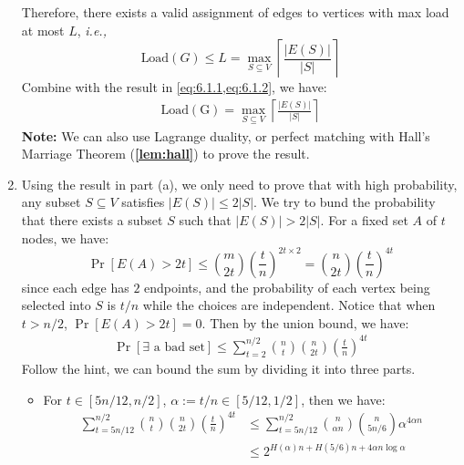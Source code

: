 \begin{answer}
\begin{enumerate}[label=\alph*).]
        Therefore, there exists a valid assignment of edges to vertices with max load at most $L$, \textit{i.e.,}
        \begin{equation}
            \label{eq:6.1.2}
            \text{Load}(G) \le L = \max_{S\subseteq V}\left\lceil\frac{|E(S)|}{|S|}\right\rceil
        \end{equation}
        Combine with the result in \cref{eq:6.1.1,eq:6.1.2}, we have:
        \begin{align*}
            \operatorname{Load(G)}=\max_{S\subseteq V}\left\lceil\frac{|E(S)|}{|S|}\right\rceil
        \end{align*}
        \textbf{Note:} We can also use Lagrange duality, or perfect matching with Hall's Marriage Theorem (\textbf{\cref{lem:hall}}) to prove the result.
        \item Using the result in part (a), we only need to prove that with high probability, any subset $S \subseteq V$ 
        satisfies $|E(S)| \le 2|S|$. We try to bund the probability that there exists a subset $S$ such that $|E(S)| > 2|S|$. For a fixed set $A$ of $t$ nodes, we have:
        \begin{equation*}
            \Pr\left[E(A) > 2t\right] \le \binom{m}{2t} \left(\frac{t}{n}\right)^{2t\times 2} = \binom{n}{2t} \left(\frac{t}{n}\right)^{4t}
        \end{equation*}
        since each edge has $2$ endpoints, and the probability of each vertex being selected into $S$ is $t / n$ while the choices are independent. 
        Notice that when $t > n/2$, $\Pr\left[E(A) > 2t\right] = 0$.
        Then by the union bound, we have:
        \begin{align*}
            \Pr\left[\exists \text{ a bad set}\right] \le \sum_{t = 2}^{n/2} \binom{n}{t} \binom{n}{2t} \left(\frac{t}{n}\right)^{4t}
        \end{align*}
        Follow the hint, we can bound the sum by dividing it into three parts. 
        \begin{itemize}
            \item For $t \in [5n/12, n/2]$, $\alpha := t / n \in [5/12, 1/2]$, then we have:
            \begin{align*}
                \sum_{t=5n/12}^{n/2} \binom{n}{t} \binom{n}{2t} \left(\frac{t}{n}\right)^{4t} &\le \sum_{t=5n/12}^{n/2} \binom{n}{\alpha n} \binom{n}{5n/6} \alpha^{4\alpha n} \\ 
                &\le 2^{H(\alpha) n + H(5/6) n + 4\alpha n \log \alpha} \\

\end{align*}
\end{itemize}
\end{enumerate}
\end{answer}
